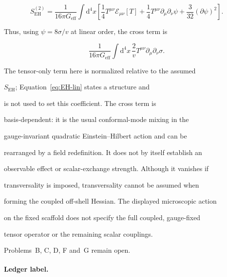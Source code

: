 \[

  S_{\mathrm{EH}}^{(2)}

  =\frac{1}{16\pi G_{\mathrm{eff}}}

   \int\mathrm{d}^4x\left[

     \frac14T^{\mu\nu}\mathcal E_{\mu\nu}[T]

    +\frac14T^{\mu\nu}\partial_\mu\partial_\nu\psi

    +\frac{3}{32}(\partial\psi)^2

   \right].

\]

Thus, using \(\psi=8\sigma/v\) at linear order, the cross term is

\[

  \frac{1}{16\pi G_{\mathrm{eff}}}

  \int\mathrm{d}^4x\,\frac{2}{v}

  T^{\mu\nu}\partial_\mu\partial_\nu\sigma .

\]

The tensor-only term here is normalized relative to the assumed

\(S_{\mathrm{EH}}\); Equation~\ref{eq:EH-lin} states a structure and

is not used to set this coefficient. The cross term is

basis-dependent: it is the usual conformal-mode mixing in the

gauge-invariant quadratic Einstein--Hilbert action and can be

rearranged by a field redefinition. It does not by itself establish an

observable effect or scalar-exchange strength. Although it vanishes if

transversality is imposed, transversality cannot be assumed when

forming the coupled off-shell Hessian. The displayed microscopic action

on the fixed scaffold does not specify the full coupled, gauge-fixed

tensor operator or the remaining scalar couplings.

Problems~B, C, D, F and~G remain open.





\paragraph{Ledger label.} \label{detail:sec-C-paragraphledgerlabel-12}

